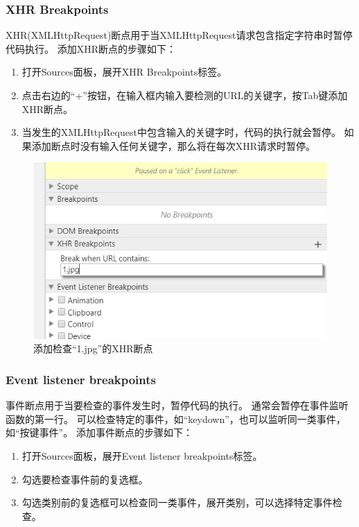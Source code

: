 \subsubsection{XHR Breakpoints}
XHR(XMLHttpRequest)断点用于当XMLHttpRequest请求包含指定字符串时暂停代码执行。
添加XHR断点的步骤如下：
\begin{enumerate}
\item 打开Sources面板，展开XHR Breakpoints标签。
\item 点击右边的“+”按钮，在输入框内输入要检测的URL的关键字，按Tab键添加XHR断点。
\item 当发生的XMLHttpRequest中包含输入的关键字时，代码的执行就会暂停。
如果添加断点时没有输入任何关键字，那么将在每次XHR请求时暂停。
\end{enumerate}

\begin{figure}[H] 
\centering 
\includegraphics{image/devtools_study/add_xhr_breakpoint.png} 
\caption{添加检查“1.jpg”的XHR断点} \label{fig:add_xhr_breakpoint} 
\end{figure}

\subsubsection{Event listener breakpoints}
事件断点用于当要检查的事件发生时，暂停代码的执行。
通常会暂停在事件监听函数的第一行。
可以检查特定的事件，如“keydown”，也可以监听同一类事件，如“按键事件”。
添加事件断点的步骤如下：
\begin{enumerate}
\item 打开Sources面板，展开Event listener breakpoints标签。
\item 勾选要检查事件前的复选框。
\item 勾选类别前的复选框可以检查同一类事件，展开类别，可以选择特定事件检查。
\end{enumerate}


